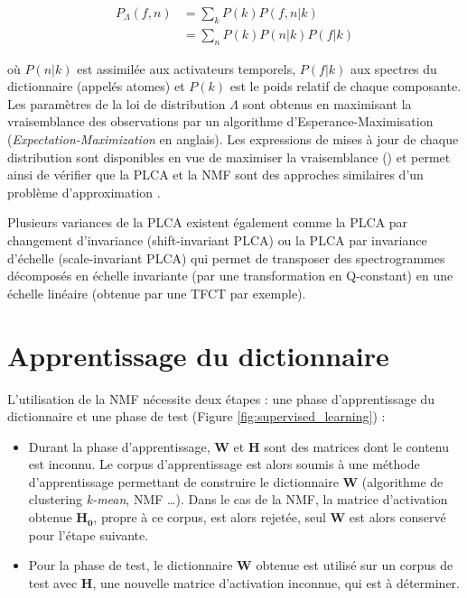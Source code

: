 \begin{align}
P_{\Lambda}\left(f,n\right) &= \sum_k P\left( k \right)P\left(f, n\vert k \right)\\
& = \sum_n P(k)P \left(n \vert k\right)P\left(f \vert k \right)
\end{align}

où $P\left( n \vert k \right)$ est assimilée aux activateurs temporels, $P\left(f \vert k \right)$ aux spectres du dictionnaire (appelés atomes) et $P\left(k \right)$ est le poids relatif de chaque composante. Les paramètres de la loi de distribution $\Lambda$ sont obtenus en maximisant la vraisemblance des observations par un algorithme d'{Esperance-Maximisation} (\textit{Expectation-Maximization} en anglais). Les expressions de mises à jour de chaque distribution sont disponibles en vue de maximiser la vraisemblance (\cite{shashanka_probabilistic_2008}) et permet ainsi de vérifier que la PLCA et la NMF sont des approches similaires d'un problème d'approximation \cite{gaussier_relation_2005}.

Plusieurs variances de la PLCA existent également comme la PLCA par changement d'invariance (shift-invariant PLCA) \cite{smaragdis_shift-invariant_2007} ou la PLCA par invariance d'échelle (scale-invariant PLCA) \cite{hennequin_scale-invariant_2011} qui permet de transposer des spectrogrammes décomposés en échelle invariante (par une transformation en Q-constant) en une échelle linéaire (obtenue par une TFCT par exemple).

\section{Apprentissage du dictionnaire}

L'utilisation de la NMF nécessite deux étapes : une phase d'apprentissage du dictionnaire et une phase de test (Figure \ref{fig:supervised_learning}) :

\begin{itemize}
\item Durant la phase d'apprentissage, $\mathbf{W}$ et $\mathbf{H}$ sont des matrices dont le contenu est inconnu. Le corpus d'apprentissage est alors soumis à une méthode d'apprentissage permettant de construire le dictionnaire $\mathbf{W}$ (algorithme de clustering \textit{k-mean}, NMF \dots). Dans le cas de la NMF, la matrice d'activation obtenue $\mathbf{H_0}$, propre à ce corpus, est alors rejetée, seul $\mathbf{W}$ est alors conservé pour l'étape suivante.
\item Pour la phase de test, le dictionnaire $\mathbf{W}$ obtenue est utilisé sur un corpus de test avec $\mathbf{H}$, une nouvelle matrice d'activation inconnue, qui est à déterminer.
\end{itemize}

